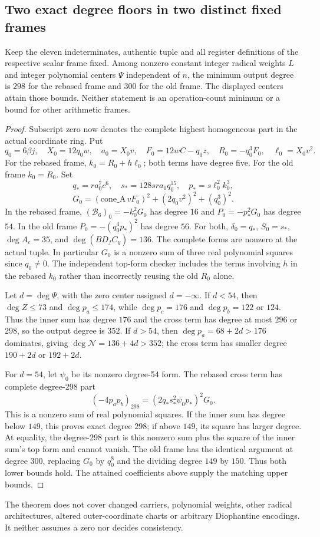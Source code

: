 \subsection{Two exact degree floors in two distinct fixed frames}
\begin{theorem}\label{thm:degree-floor}
Keep the eleven indeterminates, authentic tuple and all register definitions
of the respective scalar frame fixed. Among nonzero constant
integer radical weights $L$ and integer polynomial centers $\Psi$
independent of $n$, the minimum output degree is $298$ for the rebased
frame and $300$ for the old frame. The displayed centers attain those
bounds. Neither statement is an operation-count minimum or a bound for
other arithmetic frames.
\end{theorem}
\begin{proof}
Subscript zero now denotes the complete highest homogeneous part in the
actual coordinate ring. Put
\[
 q_0=6\beta j,\quad X_0=12q_0w,\quad a_0=X_0v,
 \quad F_0=12wC-q_0z,\quad R_0=-q_0^3F_0,
 \quad\ell_0=X_0v^2.
\]
For the rebased frame, $k_0=R_0+h\ell_0$; both terms have degree five.
For the old frame $k_0=R_0$. Set
\[
 q_*=ra_0^7c^6,\quad s_*=128sra_0q_0^{15},\quad
 p_*=s\ell_0^2k_0^3,
\]
\[
 G_0=(\mathrm{cone\_A}\,vF_0)^2+(2q_0v^2)^2+(q_0^3)^2.
\]
In the rebased frame,
$(\mathcal B_6)_0=-k_0^2G_0$ has degree $16$ and
$P_0=-p_*^2G_0$ has degree $54$.
In the old frame $P_0=-(q_0^4p_*)^2$ has degree $56$.
For both, $\delta_0=q_*$, $S_0=s_*$,
$\deg A_c=35$, and $\deg(BD_fC_y)=136$.
The complete forms are nonzero at the actual tuple. In particular
$G_0$ is a nonzero sum of three real polynomial squares since $q_0\ne0$.
The independent top-form checker includes the terms involving $h$ in
the rebased $k_0$ rather than incorrectly reusing the old $R_0$ alone.

Let $d=\deg\Psi$, with the zero center assigned $d=-\infty$.
If $d<54$, then $\deg Z\le73$ and $\deg p_a\le174$, while
$\deg p_c=176$ and $\deg p_b=122$ or $124$. Thus the inner sum
has degree $176$ and the cross term has degree at most $296$ or $298$,
so the output degree is $352$. If $d>54$, then
$\deg p_a=68+2d>176$ dominates, giving
$\deg\mathcal N=136+4d>352$; the cross term has smaller degree
$190+2d$ or $192+2d$.

For $d=54$, let $\psi_0$ be its nonzero degree-54 form. The rebased
cross term has complete degree-298 part
\[
 (-4p_ap_b)_{298}
       =(2q_*s_*^2\psi_0p_*)^2G_0.
\]
This is a nonzero sum of real polynomial squares. If the inner sum has
degree below $149$, this proves exact degree $298$; if above $149$,
its square has larger degree. At equality, the degree-298 part is this
nonzero sum plus the square of the inner sum's top form and cannot vanish.
The old frame has the identical argument at degree $300$, replacing
$G_0$ by $q_0^8$ and the dividing degree $149$ by $150$.
Thus both lower bounds hold. The attained coefficients above supply the
matching upper bounds.
\end{proof}
The theorem does not cover changed carriers, polynomial weights, other
radical architectures, altered outer-coordinate charts or arbitrary
Diophantine encodings. It neither assumes a zero nor decides consistency.



